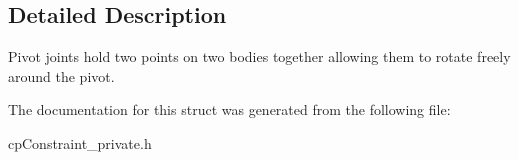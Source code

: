 \subsection{Detailed Description}
Pivot joints hold two points on two bodies together allowing them to rotate freely around the pivot. 

The documentation for this struct was generated from the following file\+:\begin{DoxyCompactItemize}
\item 
cp\+Constraint\+\_\+private.\+h\end{DoxyCompactItemize}
